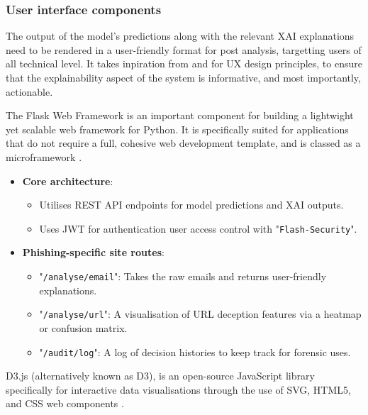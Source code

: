 
\subsubsection*{User interface components}
The output of the model's predictions along with the relevant XAI explanations need to be rendered in a user-friendly format for post analysis, targetting users of all technical level. It takes inpiration from \cite{van2024applicability} and \cite{greco2023explaining} for UX design principles, to ensure that the explainability aspect of the system is informative, and most importantly, actionable.\newline

\noindent The Flask Web Framework is an important component for building a lightwight yet scalable web framework for Python. It is specifically suited for applications that do not require a full, cohesive web development template, and is classed as a microframework \citep{pallets2010}.

\begin{itemize}
  \item \textbf{Core architecture}:
  \begin{itemize}
    \item Utilises REST API endpoints for model predictions and XAI outputs.
    \item Uses JWT for authentication user access control with "\texttt{Flash-Security}".
  \end{itemize}
  \item \textbf{Phishing-specific site routes}:
  \begin{itemize}
    \item "\texttt{/analyse/email}": Takes the raw emails and returns user-friendly explanations.
    \item "\texttt{/analyse/url}": A visualisation of URL deception features via a heatmap or confusion matrix.
    \item "\texttt{/audit/log}": A log of decision histories to keep track for forensic uses.
  \end{itemize}
\end{itemize}

\noindent D3.js (alternatively known as D3), is an open-source JavaScript library specifically for interactive data visualisations through the use of SVG, HTML5, and CSS web components \citep{observable2025d3}.

